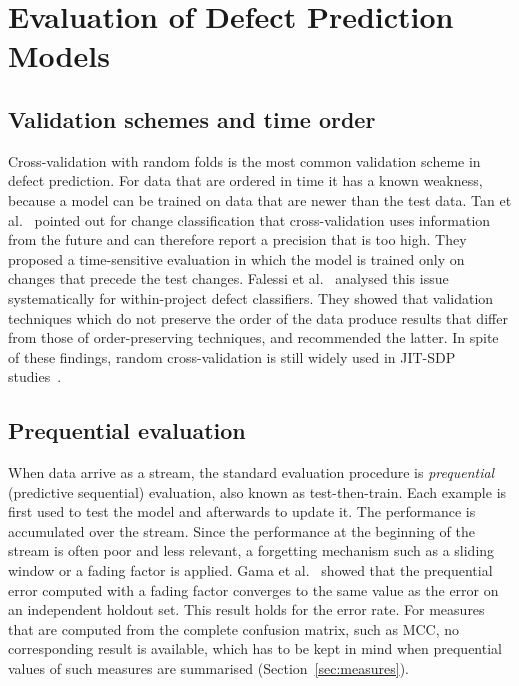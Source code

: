 \documentclass[12pt,a4paper,oneside]{report}
\begin{document}
\section{Evaluation of Defect Prediction Models}

\subsection{Validation schemes and time order}

Cross-validation with random folds is the most common validation scheme in
defect prediction. For data that are ordered in time it has a known weakness,
because a model can be trained on data that are newer than the test data. Tan
et al.~\cite{tan2015online} pointed out for change classification that
cross-validation uses information from the future and can therefore report a
precision that is too high. They proposed a time-sensitive evaluation in
which the model is trained only on changes that precede the test changes.
Falessi et al.~\cite{falessi2020order} analysed this issue systematically for
within-project defect classifiers. They showed that validation techniques
which do not preserve the order of the data produce results that differ from
those of order-preserving techniques, and recommended the latter. In spite of
these findings, random cross-validation is still widely used in JIT-SDP
studies~\cite{zhao2023survey}.

\subsection{Prequential evaluation}

When data arrive as a stream, the standard evaluation procedure is
\emph{prequential} (predictive sequential) evaluation, also known as
test-then-train. Each example is first used to test the model and afterwards
to update it. The performance is accumulated over the stream. Since the
performance at the beginning of the stream is often poor and less relevant, a
forgetting mechanism such as a sliding window or a fading factor is applied.
Gama et al.~\cite{gama2013prequential} showed that the prequential error
computed with a fading factor converges to the same value as the error on an
independent holdout set. This result holds for the error rate. For measures
that are computed from the complete confusion matrix, such as MCC, no
corresponding result is available, which has to be kept in mind when
prequential values of such measures are summarised
(Section~\ref{sec:measures}).
\end{document}
